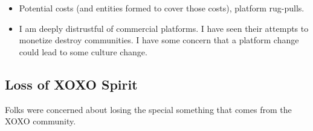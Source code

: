 \documentclass[
]{book}
\providecommand{\tightlist}{%
  \setlength{\itemsep}{0pt}\setlength{\parskip}{0pt}}
\begin{document}
\begin{itemize}
\tightlist
\item
  Potential costs (and entities formed to cover those costs), platform rug-pulls.
\item
  I am deeply distrustful of commercial platforms. I have seen their attempts to monetize destroy communities. I have some concern that a platform change could lead to some culture change.
\end{itemize}

\subsection{Loss of XOXO Spirit}\label{loss-of-xoxo-spirit}

Folks were concerned about losing the special something that comes from the XOXO community.
\end{document}
